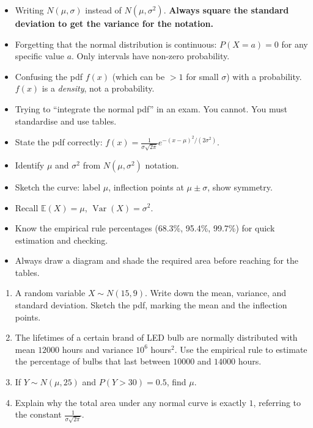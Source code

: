 \documentclass[11pt]{article}
\begin{document}
\begin{attention}
\begin{itemize}
    \item Writing $N(\mu,\sigma)$ instead of $N(\mu,\sigma^2)$. \textbf{Always square the standard deviation to get the variance for the notation.}
    \item Forgetting that the normal distribution is continuous: $P(X = a) = 0$ for any specific value $a$. Only intervals have non-zero probability.
    \item Confusing the pdf $f(x)$ (which can be $>1$ for small $\sigma$) with a probability. $f(x)$ is a \emph{density}, not a probability.
    \item Trying to ``integrate the normal pdf'' in an exam. You cannot. You must standardise and use tables.
\end{itemize}
\end{attention}

\begin{aretenir}
\begin{itemize}
    \item State the pdf correctly: $f(x) = \frac{1}{\sigma\sqrt{2\pi}} e^{-(x-\mu)^2/(2\sigma^2)}$.
    \item Identify $\mu$ and $\sigma^2$ from $N(\mu,\sigma^2)$ notation.
    \item Sketch the curve: label $\mu$, inflection points at $\mu\pm\sigma$, show symmetry.
    \item Recall $\mathbb{E}(X)=\mu$, $\operatorname{Var}(X)=\sigma^2$.
    \item Know the empirical rule percentages (68.3\%, 95.4\%, 99.7\%) for quick estimation and checking.
    \item Always draw a diagram and shade the required area before reaching for the tables.
\end{itemize}
\end{aretenir}

\begin{exercice}[Practice]
\begin{enumerate}
    \item A random variable $X \sim N(15, 9)$. Write down the mean, variance, and standard deviation. Sketch the pdf, marking the mean and the inflection points.
    \item The lifetimes of a certain brand of LED bulb are normally distributed with mean $12000$ hours and variance $10^6$ hours$^2$. Use the empirical rule to estimate the percentage of bulbs that last between $10000$ and $14000$ hours.
    \item If $Y \sim N(\mu, 25)$ and $P(Y > 30) = 0.5$, find $\mu$.
    \item Explain why the total area under any normal curve is exactly $1$, referring to the constant $\frac{1}{\sigma\sqrt{2\pi}}$.
\end{enumerate}
\end{exercice}
\end{document}

